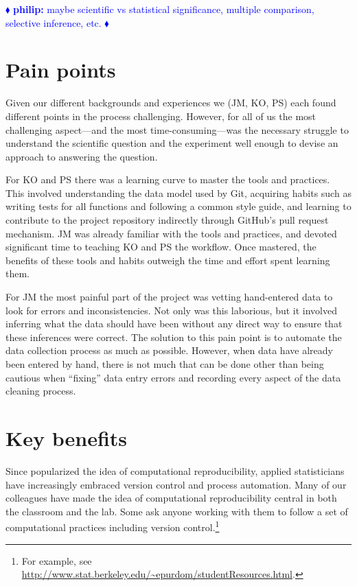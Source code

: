 \documentclass[]{article}
\newcommand{\philip}[1] { \textcolor{blue} {
\ensuremath{\blacklozenge} {\bf philip:}  {#1}
\ensuremath{\blacklozenge} } }
\begin{document}
\philip{
maybe scientific vs statistical significance, multiple comparison, selective
inference, etc.
}

\section{Pain points}

Given our different backgrounds and experiences we (JM, KO, PS) each found
different points in the process challenging. 
However, for all of us the most challenging aspect---and the most 
time-consuming---was the necessary
struggle to understand the scientific question and the experiment
well enough to devise an approach to answering the question.

For KO and PS there was a learning curve to master the tools and practices.
This involved understanding the data model used by Git, acquiring habits such
as writing tests for all functions and following a common style guide, and
learning to contribute to the project repository indirectly through GitHub's
pull request mechanism.
JM was already familiar with the tools and practices, and devoted significant time
to teaching KO and PS the workflow.
Once mastered, the benefits of these tools and habits outweigh the time and effort
spent learning them.

For JM the most painful part of the project was vetting hand-entered data
to look for errors and inconsistencies.
Not only was this laborious, but it involved inferring what the data
should have been without any direct way to ensure that these inferences were
correct.
The solution to this pain point is to automate the data collection process as
much as possible.
However, when data have already been entered by hand, there is not much that can
be done other than being cautious when ``fixing'' data entry errors and recording
every aspect of the data cleaning process.

\section{Key benefits}

Since \citet{buckheit1995wavelab} popularized the idea of computational
reproducibility, applied statisticians have increasingly embraced version control
and process automation.
Many of our colleagues have made the idea of computational reproducibility
central in both the classroom and the lab.
Some ask anyone working with them to follow a set of computational practices
including version control.\footnote{
  For example, see
  \url{http://www.stat.berkeley.edu/~epurdom/studentResources.html}.
}
\end{document}
